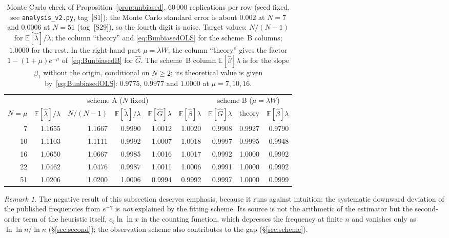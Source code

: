 \documentclass[11pt,a4paper]{article}
\theoremstyle{plain}
\theoremstyle{remark}
\newtheorem{remark}{Remark}
\newcommand{\emg}{e^{-\gamma}}
\begin{document}
\begin{table}[t]
\centering
\caption{Monte Carlo check of Proposition~\ref{prop:unbiased}, $60\,000$
replications per row (seed fixed, see \texttt{analysis\_v2.py}, tag~[S1]); the
Monte Carlo standard error is about $0.002$ at $N=7$ and $0.0006$ at $N=51$
(tag~[S29]), so the fourth digit is noise. Target values: $N/(N-1)$ for $\mathbb E[\hat\lambda]/\lambda$; the column
``theory'' and \eqref{eq:BunbiasedOLS} for the scheme~B columns; $1.0000$ for
the rest. In the right-hand part $\mu=\lambda W$; the column ``theory'' gives the factor
$1-(1+\mu)e^{-\mu}$ of~\eqref{eq:BunbiasedB} for $\hat G$. The scheme~B column
$\mathbb E[\hat\beta]\lambda$ is for the slope $\hat\beta_1$ without the origin,
conditional on $N\ge2$; its theoretical value is given
by~\eqref{eq:BunbiasedOLS}: $0.9775$, $0.9977$ and $1.0000$ at $\mu=7,10,16$.}
\label{tab:mc}
\small
\begin{tabular}{rrrrrr@{\qquad}rrr}
\toprule
& \multicolumn{5}{c}{scheme A ($N$ fixed)} & \multicolumn{3}{c}{scheme B ($\mu=\lambda W$)}\\
\cmidrule(r){2-6}\cmidrule(l){7-9}
$N=\mu$ & $\mathbb E[\hat\lambda]/\lambda$ & $N/(N-1)$
& $\mathbb E[\tilde\lambda]/\lambda$ & $\mathbb E[\hat G]\lambda$
& $\mathbb E[\hat\beta]\lambda$
& $\mathbb E[\hat G]\lambda$ & theory & $\mathbb E[\hat\beta]\lambda$\\
\midrule
7 & 1.1655 & 1.1667 & 0.9990 & 1.0012 & 1.0020 & 0.9908 & 0.9927 & 0.9790\\
10 & 1.1103 & 1.1111 & 0.9992 & 1.0007 & 1.0018 & 0.9997 & 0.9995 & 0.9948\\
16 & 1.0650 & 1.0667 & 0.9985 & 1.0016 & 1.0017 & 0.9992 & 1.0000 & 0.9992\\
22 & 1.0462 & 1.0476 & 0.9987 & 1.0011 & 1.0006 & 0.9991 & 1.0000 & 0.9992\\
51 & 1.0206 & 1.0200 & 1.0006 & 0.9994 & 0.9992 & 0.9997 & 1.0000 & 0.9999\\
\bottomrule
\end{tabular}
\end{table}

\begin{remark}
The negative result of this subsection deserves emphasis, because it runs
against intuition: the systematic downward deviation of the published
frequencies from $\emg$ is \emph{not} explained by the fitting scheme. Its
source is not the arithmetic of the estimator but the second-order term of the
heuristic itself, $c_b\ln\ln x$ in the counting function, which depresses the
frequency at finite $n$ and vanishes only as $\ln\ln n/\ln n$
(\S\ref{sec:second}); the
observation scheme also contributes to the gap (\S\ref{sec:scheme}).
\end{remark}
\end{document}
